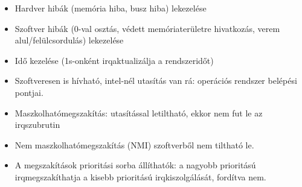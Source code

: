 \documentclass[11pt,a4paper]{article}
\begin{document}
\begin{tcolorbox}[colback=blue!5!white,colframe=blue!50!black,title= 14. Ismertesse a periféria csatolási módszereket{,} módszerenként kitérve az adott módszer előnyére{,} és hátrányára! Part 1.]
\begin{itemize}
\begin{itemize}
                        \item Hardver hibák (memória hiba, busz hiba) lekezelése
                        \item Szoftver hibák (0-val osztás, védett memóriaterületre hivatkozás, verem alul/felülcsordulás) lekezelése
                        \item Idő kezelése (1s-onként irqaktualizálja a rendszeridőt)
                        \item Szoftveresen is hívható, intel-nél utasítás van rá: operációs rendszer belépési pontjai.
                        \item Maszkolhatómegszakítás: utasítással letiltható, ekkor nem fut le az irqszubrutin
                        \item Nem maszkolhatómegszakítás (NMI) szoftverből nem tiltható le.
                        \item A megszakítások prioritási sorba állíthatók: a nagyobb prioritású irqmegszakíthatja a kisebb prioritású irqkiszolgálását, fordítva nem.
                    \end{itemize}
                \end{itemize}
            \end{tcolorbox}
\end{document}
